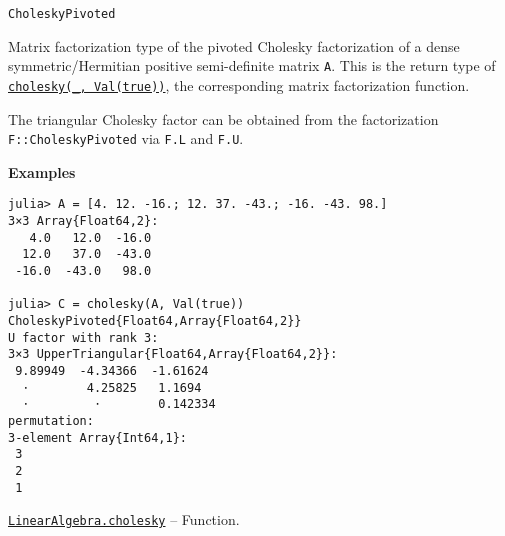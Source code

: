 \begin{adjustwidth}{2em}{0pt}


\begin{verbatim}
CholeskyPivoted
\end{verbatim}

Matrix factorization type of the pivoted Cholesky factorization of a dense symmetric/Hermitian positive semi-definite matrix \texttt{A}. This is the return type of \hyperlink{7653413936706994771}{\texttt{cholesky(\_, Val(true))}}, the corresponding matrix factorization function.

The triangular Cholesky factor can be obtained from the factorization \texttt{F::CholeskyPivoted} via \texttt{F.L} and \texttt{F.U}.

\textbf{Examples}


\begin{verbatim}
julia> A = [4. 12. -16.; 12. 37. -43.; -16. -43. 98.]
3×3 Array{Float64,2}:
   4.0   12.0  -16.0
  12.0   37.0  -43.0
 -16.0  -43.0   98.0

julia> C = cholesky(A, Val(true))
CholeskyPivoted{Float64,Array{Float64,2}}
U factor with rank 3:
3×3 UpperTriangular{Float64,Array{Float64,2}}:
 9.89949  -4.34366  -1.61624
  ⋅        4.25825   1.1694
  ⋅         ⋅        0.142334
permutation:
3-element Array{Int64,1}:
 3
 2
 1
\end{verbatim}



\end{adjustwidth}
\hypertarget{7653413936706994771}{} 
\hyperlink{7653413936706994771}{\texttt{LinearAlgebra.cholesky}}  -- {Function.}

